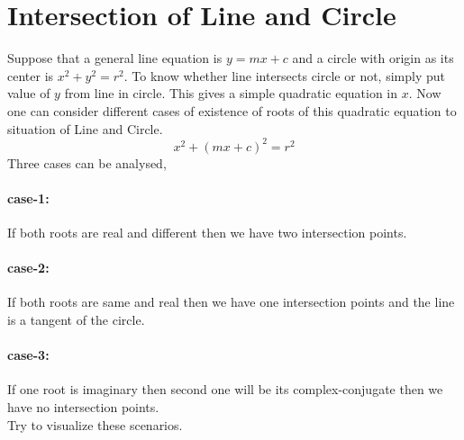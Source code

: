 \documentclass{article}
\begin{document}
\section{Intersection of Line and Circle}
Suppose that a general line equation is $y=mx+c$ and a circle with origin as its center is $x^2+y^2=r^2$. To know whether line intersects circle or not, simply put value of $y$ from line in circle. This gives a simple quadratic equation in $x$. Now one can consider different cases of existence of roots of this quadratic equation to situation of Line and Circle.
\begin{equation*}
    x^2+(mx+c)^2=r^2
\end{equation*}
Three cases can be analysed,
\paragraph{case-1:} If both roots are real and different then we have two intersection points.
\paragraph{case-2:} If both roots are same and real then we have one intersection points and the line is a tangent of the circle.
\paragraph{case-3:} If one root is imaginary then second one will be its complex-conjugate then we have no intersection points.\\
Try to visualize these scenarios.
\end{document}

